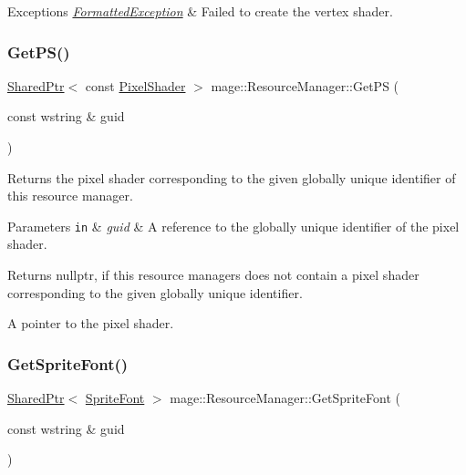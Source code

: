 \begin{DoxyExceptions}{Exceptions}
{\em \hyperlink{structmage_1_1_formatted_exception}{Formatted\+Exception}} & Failed to create the vertex shader. \\
\hline
\end{DoxyExceptions}
\hypertarget{classmage_1_1_resource_manager_acf32120f85d46e82d2ddcfc8fe66bea7}{}\label{classmage_1_1_resource_manager_acf32120f85d46e82d2ddcfc8fe66bea7} 
\subsubsection{\texorpdfstring{Get\+P\+S()}{GetPS()}}
{\footnotesize\ttfamily \hyperlink{namespacemage_a1e01ae66713838a7a67d30e44c67703e}{Shared\+Ptr}$<$ const \hyperlink{namespacemage_ac98506b7edd999ea43ec46fbd0330238}{Pixel\+Shader} $>$ mage\+::\+Resource\+Manager\+::\+Get\+PS (\begin{DoxyParamCaption}\item[{const wstring \&}]{guid }\end{DoxyParamCaption})\hspace{0.3cm}{\ttfamily [noexcept]}}

Returns the pixel shader corresponding to the given globally unique identifier of this resource manager.


\begin{DoxyParams}[1]{Parameters}
\mbox{\tt in}  & {\em guid} & A reference to the globally unique identifier of the pixel shader. \\
\hline
\end{DoxyParams}
\begin{DoxyReturn}{Returns}
{\ttfamily nullptr}, if this resource managers does not contain a pixel shader corresponding to the given globally unique identifier. 

A pointer to the pixel shader. 
\end{DoxyReturn}
\hypertarget{classmage_1_1_resource_manager_a6ad7dc799e076da85d4638380b1838ff}{}\label{classmage_1_1_resource_manager_a6ad7dc799e076da85d4638380b1838ff} 
\subsubsection{\texorpdfstring{Get\+Sprite\+Font()}{GetSpriteFont()}}
{\footnotesize\ttfamily \hyperlink{namespacemage_a1e01ae66713838a7a67d30e44c67703e}{Shared\+Ptr}$<$ \hyperlink{classmage_1_1_sprite_font}{Sprite\+Font} $>$ mage\+::\+Resource\+Manager\+::\+Get\+Sprite\+Font (\begin{DoxyParamCaption}\item[{const wstring \&}]{guid }\end{DoxyParamCaption})\hspace{0.3cm}{\ttfamily [noexcept]}}

